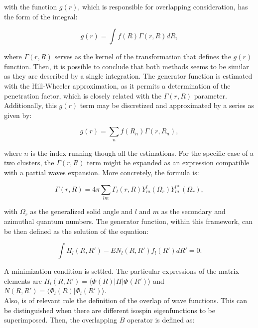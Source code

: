 \documentclass[openany]{book}
\begin{document}
with the function $g(r)$, which is responsible for overlapping consideration, has the form of the integral: 

\begin{equation}\label{eq:micro_cluster_equivalency_GCM_g}
	g(r) = \int f(R) \Gamma(r, R) dR,
\end{equation}

where $\Gamma(r, R)$ serves as the kernel of the transformation that defines the $g(r)$ function. Then, it is possible to conclude that both methods seems to be similar as they are described by a single integration. The generator function is estimated with the Hill-Wheeler approximation, as it permits a determination of the penetration factor, which is closely related with the $\Gamma(r, R)$ parameter. \\

Additionally, this $g(r)$ term may be discretized and approximated by a series as given by: 

\begin{equation}\label{eq:micro_cluster_equivalency_GCM_g_series}
	g(r) = \sum_n f(R_n) \Gamma(r, R_n),
\end{equation}

where $n$ is the index running though all the estimations. For the specific case of a two clusters, the $\Gamma(r, R)$ term might be expanded as an expression compatible with a partial waves expansion. More concretely, the formula is:

\begin{equation}\label{eq:micro_cluster_gamma}
	\Gamma(r, R) = 4\pi \sum_{lm} {\Gamma_l(r, R) Y^{l}_m(\Omega_r) Y^{l*}_m(\Omega_r)},
\end{equation}

with $\Omega_r$ as the generalized solid angle and $l$ and $m$ as the secondary and azimuthal quantum numbers. The generator function, within this framework, can be then defined as the solution of the equation: 

\begin{equation}\label{eq:micro_cluster_g_equation}
	\int H_l(R, R') - E N_l(R, R') f_l(R') dR' = 0.
\end{equation}

A minimization condition is settled. The particular expressions of the matrix elements are $ H_l(R, R') = \langle  \Phi(R) | H | \Phi(R') \rangle $ and $ N(R, R') = \langle  \Phi_l(R) | \Phi_l(R') \rangle $. \\

Also, is of relevant role the definition of the overlap of wave functions. This can be distinguished when there are different isospin eigenfunctions to be superimposed. Then, the overlapping $B$ operator is defined as: 
\end{document}
